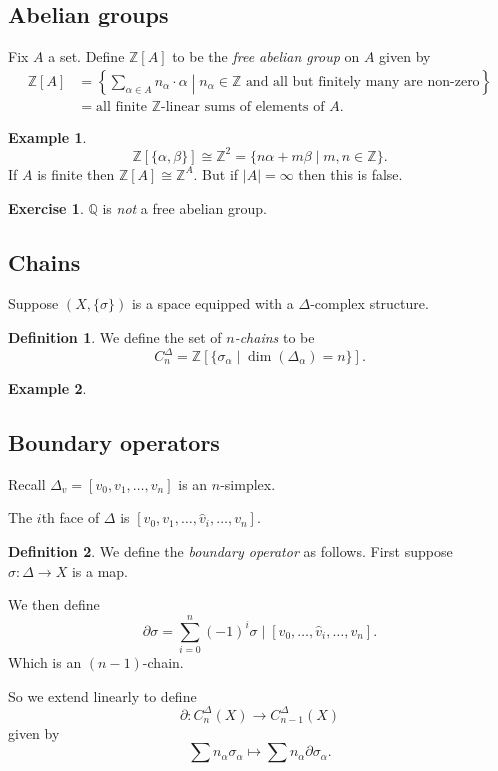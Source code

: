 \documentclass[12pt]{article}
\theoremstyle{definition}
\theoremstyle{definition}
\newtheorem*{defn}{Definition}
\newtheorem*{ex}{Example}
\newtheorem*{exer}{Exercise}
\newcommand{\ZZ}{\mathbb{Z}}
\newcommand{\QQ}{\mathbb{Q}}
\begin{document}
\subsection{Abelian groups}
Fix $A$ a set.
Define $\ZZ[A]$ to be the \emph{free abelian group} on $A$ given by
\begin{align*}
\ZZ[A] &= \left\{ \sum_{\alpha\in A} n_\alpha \cdot \alpha \middle| n_\alpha\in\ZZ\text{ and all but finitely many are non-zero}\right\} \\
&= \text{all finite }\ZZ\text{-linear sums of elements of }A.
\end{align*}

\begin{ex}
\[\ZZ[\{\alpha,\beta\}] \cong \ZZ^2 = \{n\alpha + m\beta \mid m,n\in \ZZ\}.\]
If $A$ is finite then $\ZZ[A] \cong \ZZ^A$.
But if $|A| = \infty$ then this is false.
\end{ex}

\begin{exer}
$\QQ$ is \emph{not} a free abelian group.
\end{exer}

\subsection{Chains}
Suppose $(X,\{\sigma\})$ is a space equipped with a $\Delta$-complex structure.

\begin{defn}
We define the set of \emph{$n$-chains} to be
\[C_n^\Delta = \ZZ[\{\sigma_\alpha \mid \dim(\Delta_\alpha) = n\}].\]
\end{defn}

\begin{ex}
\end{ex}

\subsection{Boundary operators}
Recall $\Delta_v = [v_0, v_1,\ldots,v_n]$ is an $n$-simplex.

The $i$th face of $\Delta$ is $[v_0, v_1, \ldots , \hat{v}_i, \ldots ,v_n]$. %

\begin{defn}
We define the \emph{boundary operator} as follows.
First suppose $\sigma \colon \Delta \to X$ is a map.

We then define
\[\partial \sigma = \sum_{i=0}^{n} (-1)^i \sigma \mid[v_0,\ldots,\hat{v}_i, \ldots, v_n].\]
Which is an $(n-1)$-chain.

So we extend linearly to define 
\[\partial \colon C_n^\Delta(X) \to C_{n-1}^\Delta (X)\]
given by
\[\sum n_\alpha \sigma_\alpha \mapsto \sum n_\alpha \partial \sigma_\alpha.\]
\end{defn}
\end{document}
